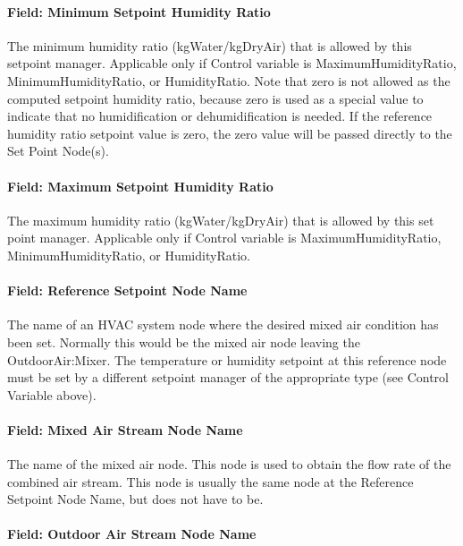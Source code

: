 \paragraph{Field: Minimum Setpoint Humidity Ratio}\label{field-minimum-setpoint-humidity-ratio}

The minimum humidity ratio (kgWater/kgDryAir) that is allowed by this setpoint manager. Applicable only if Control variable is MaximumHumidityRatio, MinimumHumidityRatio, or HumidityRatio. Note that zero is not allowed as the computed setpoint humidity ratio, because zero is used as a special value to indicate that no humidification or dehumidification is needed. If the reference humidity ratio setpoint value is zero, the zero value will be passed directly to the Set Point Node(s).

\paragraph{Field: Maximum Setpoint Humidity Ratio}\label{field-maximum-setpoint-humidity-ratio}

The maximum humidity ratio (kgWater/kgDryAir) that is allowed by this set point manager. Applicable only if Control variable is MaximumHumidityRatio, MinimumHumidityRatio, or HumidityRatio.

\paragraph{Field: Reference Setpoint Node Name}\label{field-reference-setpoint-node-name-1}

The name of an HVAC system node where the desired mixed air condition has been set. Normally this would be the mixed air node leaving the OutdoorAir:Mixer. The temperature or humidity setpoint at this reference node must be set by a different setpoint manager of the appropriate type (see Control Variable above).

\paragraph{Field: Mixed Air Stream Node Name}\label{field-mixed-air-stream-node-name}

The name of the mixed air node. This node is used to obtain the flow rate of the combined air stream. This node is usually the same node at the Reference Setpoint Node Name, but does not have to be.

\paragraph{Field: Outdoor Air Stream Node Name}\label{field-outdoor-air-stream-node-name-000}

